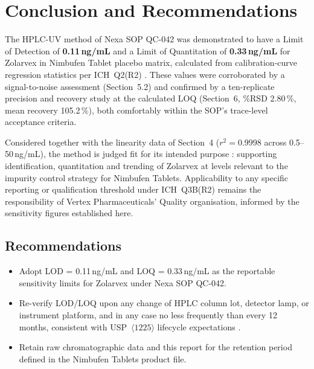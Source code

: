
\section{Conclusion and Recommendations}

The HPLC-UV method of Nexa SOP QC-042 was demonstrated to have a Limit of Detection of
\textbf{0.11\,ng/mL} and a Limit of Quantitation of \textbf{0.33\,ng/mL} for Zolarvex
in Nimbufen Tablet placebo matrix, calculated from calibration-curve regression
statistics per ICH~Q2(R2) \citep{ich2023q2r2}. These values were corroborated by a
signal-to-noise assessment (Section~5.2) and confirmed by a ten-replicate precision
and recovery study at the calculated LOQ (Section~6, \%RSD 2.80\,\%, mean recovery
105.2\,\%), both comfortably within the SOP's trace-level acceptance criteria.

Considered together with the linearity data of Section~4 ($r^2 = 0.9998$ across
0.5--50\,ng/mL), the method is judged fit for its intended purpose \citep{eurachem2014}:
supporting identification, quantitation and trending of Zolarvex at levels relevant to
the impurity control strategy for Nimbufen Tablets. Applicability to any specific
reporting or qualification threshold under ICH~Q3B(R2) \citep{ich2005q3b} remains the
responsibility of Vertex Pharmaceuticals' Quality organisation, informed by the
sensitivity figures established here.

\subsection{Recommendations}
\begin{itemize}[leftmargin=1.4em]
  \item Adopt LOD = 0.11\,ng/mL and LOQ = 0.33\,ng/mL as the reportable sensitivity
        limits for Zolarvex under Nexa SOP QC-042.
  \item Re-verify LOD/LOQ upon any change of HPLC column lot, detector lamp, or
        instrument platform, and in any case no less frequently than every
        12 months, consistent with USP~$\langle 1225 \rangle$ lifecycle expectations
        \citep{usp1225}.
  \item Retain raw chromatographic data and this report for the retention period
        defined in the Nimbufen Tablets product file.
\end{itemize}

